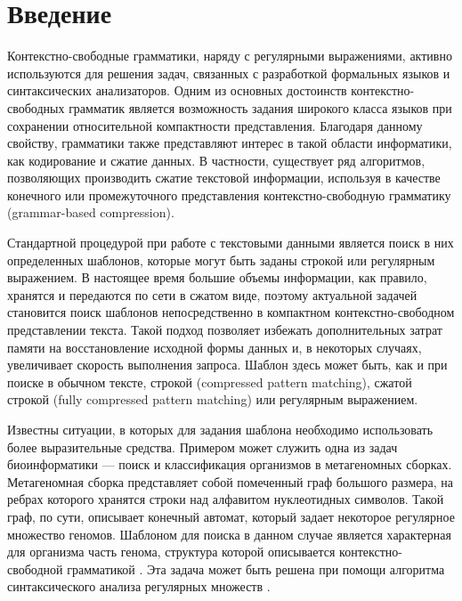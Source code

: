 \section*{Введение}

Контекстно-свободные грамматики, наряду с регулярными выражениями, активно используются для решения задач, связанных с разработкой формальных языков и синтаксических анализаторов. 
Одним из основных достоинств контекстно-свободных грамматик является возможность задания широкого класса языков при сохранении относительной компактности представления. 
Благодаря данному свойству, грамматики также представляют интерес в такой области информатики, как кодирование и сжатие данных. 
В частности, существует ряд алгоритмов, позволяющих производить сжатие текстовой информации, используя в качестве конечного \cite{Sequitur} или промежуточного \cite{Arimura} представления контекстно-свободную грамматику (grammar-based compression). 

Стандартной процедурой при работе с текстовыми данными является поиск в них определенных шаблонов, которые могут быть заданы строкой или регулярным выражением. 
В настоящее время большие объемы информации, как правило, хранятся и передаются по сети в сжатом виде, поэтому актуальной задачей становится поиск шаблонов непосредственно в компактном контекстно-свободном представлении текста. 
Такой подход позволяет избежать дополнительных затрат памяти на восстановление исходной формы данных и, в некоторых случаях, увеличивает скорость выполнения запроса. 
Шаблон здесь может быть, как и при поиске в обычном тексте, строкой (compressed pattern matching), сжатой строкой (fully compressed pattern matching) или регулярным выражением.

Известны ситуации, в которых для задания шаблона необходимо использовать более выразительные средства. 
Примером может служить одна из задач биоинформатики --- поиск и классификация организмов в метагеномных сборках. 
Метагеномная сборка представляет собой помеченный граф большого размера, на ребрах которого хранятся строки над алфавитом нуклеотидных символов. 
Такой граф, по сути, описывает конечный автомат, который задает некоторое регулярное множество геномов. 
Шаблоном для поиска в данном случае является характерная для организма часть генома, структура которой описывается контекстно-свободной грамматикой \cite{Anderson2013}. Эта задача может быть решена при помощи алгоритма синтаксического анализа регулярных множеств \cite{Nastya}.


